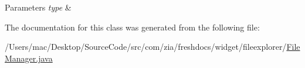 \begin{DoxyParams}{Parameters}
{\em type} & \\
\hline
\end{DoxyParams}


The documentation for this class was generated from the following file\-:\begin{DoxyCompactItemize}
\item 
/\-Users/mac/\-Desktop/\-Source\-Code/src/com/zia/freshdocs/widget/fileexplorer/\hyperlink{_file_manager_8java}{File\-Manager.\-java}\end{DoxyCompactItemize}
